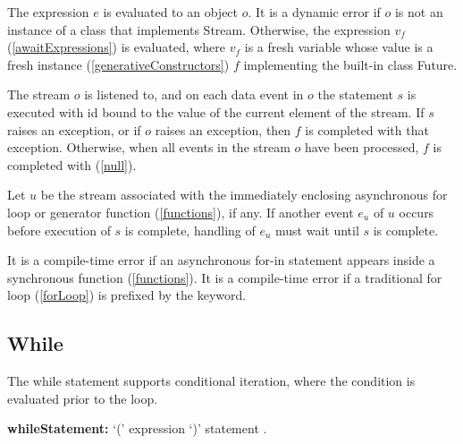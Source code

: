 \documentclass{article}
\newcommand{\code}[1]{{\sf #1}}
\begin{document}
\LMHash{}
The expression $e$ is evaluated to an object $o$. It is a dynamic error if $o$ is not an instance of a class that implements \code{Stream}. Otherwise, the expression \code{\AWAIT{} $v_f$}  (\ref{awaitExpressions}) is evaluated, where $v_f$ is a fresh variable whose value is a fresh instance (\ref{generativeConstructors}) $f$ implementing the built-in class \code{Future}.

\LMHash{}
The stream $o$ is listened to,  and on each data event in $o$ the statement $s$ is executed with \code{id} bound to the value of the current element of the stream. If $s$ raises an exception, or if $o$ raises an exception, then $f$ is completed with that exception. Otherwise, when all events in the stream $o$ have been processed, $f$ is completed with \NULL{}  (\ref{null}).

\LMHash{}
Let $u$ be the stream associated with the immediately enclosing asynchronous for loop or generator function (\ref{functions}), if any. If another event $e_u$ of $u$ occurs before execution of $s$ is complete, handling of $e_u$ must wait until $s$ is complete.


\LMHash{}
It is a compile-time error if an asynchronous for-in statement appears inside a synchronous function (\ref{functions}). It is a compile-time error if a traditional for loop  (\ref{forLoop}) is prefixed by the \AWAIT{}  keyword.


 
\subsection{While}

\LMHash{}
The while statement supports conditional iteration, where the condition is evaluated prior to the loop.

\begin{grammar}
{\bf whileStatement:}
      \WHILE{} `(' expression `)' statement  %
.
 \end{grammar}
 
\end{document}
